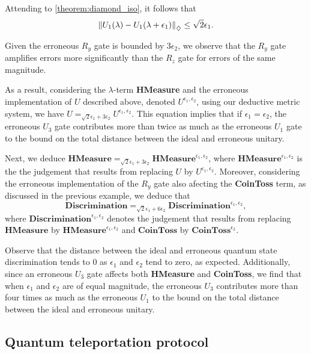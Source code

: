 \begin{example}
Attending to \autoref{theorem:diamond_iso}, it follows that
  \begin{align*}
    \left\lVert U_1(\lambda)- U_1(\lambda + \epsilon_1)  \right\rVert_{\diamondsuit} \leq \sqrt{2} \epsilon_1.
  \end{align*}

Given the erroneous $R_y$ gate is bounded by $3 \epsilon_2$, we observe that the $R_y$ gate amplifies errors more significantly than the $R_z$ gate for errors of the same magnitude.


As a result, considering the $\lambda$-term \textbf{HMeasure} and the erroneous implementation of $U$ described above, denoted $U^{\epsilon_1, \epsilon_2}$, using our deductive metric system, we have $U =_{\sqrt{2}\epsilon_1+ 3\epsilon_2} U^{\epsilon_1, \epsilon_2}$. This equation implies that if $\epsilon_1 = \epsilon_2$, the erroneous $U_3$ gate contributes more than twice as much as the erroneous $U_1$ gate to the bound on the total distance between the ideal and erroneous unitary.

Next, we deduce $\textbf{HMeasure} =_{\sqrt{2}\epsilon_1+ 3\epsilon_2} \textbf{HMeasure}^{\epsilon_1, \epsilon_2}$, where $\textbf{HMeasure}^{\epsilon_1, \epsilon_2}$ is the the judgement that results from replacing $U$ by $U^{\epsilon_1, \epsilon_2}$.
Moreover, considering the erroneous implementation of the $R_y$ gate also afecting the \textbf{CoinToss} term, as discussed in the previous example, we deduce that 
$$\textbf{Discrimination} =_{\sqrt{2}\epsilon_1+6\epsilon_2} \textbf{Discrimination}^{\epsilon_1,\epsilon_2}, $$
where $\textbf{Discrimination}^{\epsilon_1,\epsilon_2}$ denotes the judgement that results from replacing $\textbf{HMeasure}$ by $\textbf{HMeasure}^{\epsilon_1, \epsilon_2}$ and $\textbf{CoinToss}$ by  $\textbf{CoinToss}^{\epsilon_2}$.

Observe that the distance between the ideal and erroneous quantum state discrimination tends to $0$ as $\epsilon_1$ and $\epsilon_2$ tend to zero, as expected. 
Additionally, since an erroneous $U_3$ gate affects both \textbf{HMeasure} and \textbf{CoinToss}, we find that when $\epsilon_1$ and $\epsilon_2$ are of equal magnitude, the erroneous $U_3$ contributes more than four times as much as the erroneous $U_1$ to the bound on the total distance between the ideal and erroneous unitary.



\end{example}


\subsection{Quantum teleportation protocol}


